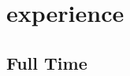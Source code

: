 \documentclass[]{friggeri-cv} %
\begin{document}


\section{experience}

\subsection{Full Time}
\end{document}

